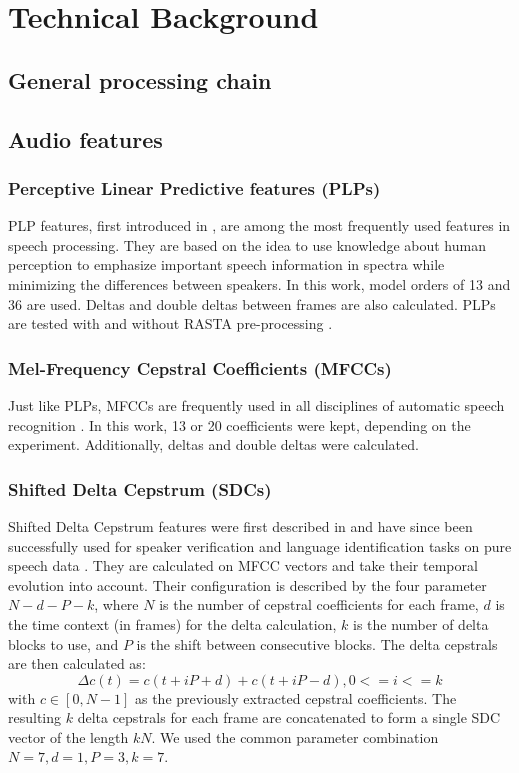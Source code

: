 
\chapter{Technical Background}	\label{chap:background}
\section{General processing chain}
\section{Audio features}
\subsection{Perceptive Linear Predictive features (PLPs)} 
PLP features, first introduced in \cite{hermansky90}, are among the most frequently used features in speech processing. They are based on the idea to use knowledge about human perception to emphasize important speech information in spectra while minimizing the differences between speakers. In this work, model orders of 13 and 36 are used. Deltas and double deltas between frames are also calculated. PLPs are tested with and without RASTA pre-processing \cite{rasta_plp}.
\subsection{Mel-Frequency Cepstral Coefficients (MFCCs)} 
Just like PLPs, MFCCs are frequently used in all disciplines of automatic speech recognition \cite{zissman}. In this work, 13 or 20 coefficients were kept, depending on the experiment. Additionally, deltas and double deltas were calculated.
\subsection{Shifted Delta Cepstrum (SDCs)} 
Shifted Delta Cepstrum features were first described in \cite{bielefeld} and have since been successfully used for speaker verification and language identification tasks on pure speech data \cite{torres} \cite{campbell} \cite{allen}. They are calculated on MFCC vectors and take their temporal evolution into account. Their configuration is described by the four parameter $N-d-P-k$, where $N$ is the number of cepstral coefficients for each frame, $d$ is the time context (in frames) for the delta calculation, $k$ is the number of delta blocks to use, and $P$ is the shift between consecutive blocks. The delta cepstrals are then calculated as:
\begin{equation}
\Delta c(t) = c(t+iP+d)+c(t+iP-d), 0<=i<=k
\end{equation}
with $c \in [0, N-1]$ as the previously extracted cepstral coefficients. The resulting $k$ delta cepstrals for each frame are concatenated to form a single SDC vector of the length $kN$. We used the common parameter combination $N=7, d=1, P=3, k=7$.
